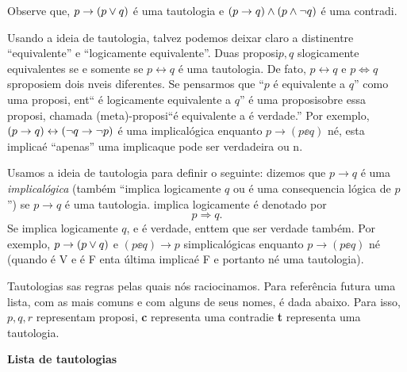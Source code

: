 Observe que, $p\to (p\vee q)$ \'e uma tautologia e $(p\to q)\wedge(p \wedge \lnot q)$ \'e uma contradi\caoi.

Usando a ideia de tautologia, talvez podemos deixar claro a distin\cao entre ``equivalente'' e ``logicamente equivalente''. Duas proposi\coes $p,q$ s\ao logicamente equivalentes se e somente se $p \leftrightarrow q$ \'e uma tautologia. De fato, $p \leftrightarrow q$ e $p\iff q$ s\ao proposi\coes em dois n\ih veis diferentes. Se pensarmos que ``$p$ \'e equivalente a $q$'' como uma proposi\caoi, ent\ao `` \pp \'e logicamente equivalente a $q$'' \'e uma proposi\cao sobre essa proposi\cao, chamada (meta)-proposi\cao ``\pp \'e equivalente a \qq \'e verdade.'' Por exemplo, $(p\to q)\leftrightarrow(\lnot q \to \lnot p)$ \'e uma implica\cao l\'ogica enquanto $p\to(p\ee q)$ n\ao \'e, esta implica\cao \'e ``apenas'' uma implica\cao que pode ser verdadeira ou n\aoi.

Usamos a ideia de tautologia para definir o seguinte: dizemos que $p\to q$ \'e uma \emph{implica\cao l\'ogica} (tamb\'em ``\pp implica logicamente $q$ ou \qq \'e uma consequencia l\'ogica de $p$'') se $p\to q$ \'e uma tautologia. \pp  implica logicamente \qq \'e denotado por
\[
p \Rightarrow q.
\]
Se \pp implica logicamente $q$, e \pp \'e verdade, ent\ao \qq tem que ser verdade tamb\'em. Por exemplo, $p\to(p\vee q)$ e $(p \ee q)\to p$ s\ao implica\coes l\'ogicas enquanto $p\to(p\ee q)$ n\ao \'e (quando \pp \'e V e \qq \'e F ent\ao a \'ultima implica\cao \'e F e portanto n\ao \'e uma tautologia).

Tautologias s\ao as regras pelas quais n\'os raciocinamos. Para refer\^encia futura uma lista, com as mais comuns e com alguns de seus nomes, \'e dada abaixo. Para isso, $p,q,r$ representam proposi\cois, {\bf c} representa uma contradi\cao e {\bf t} representa uma tautologia.
\newpage


{\bf Lista de tautologias}

